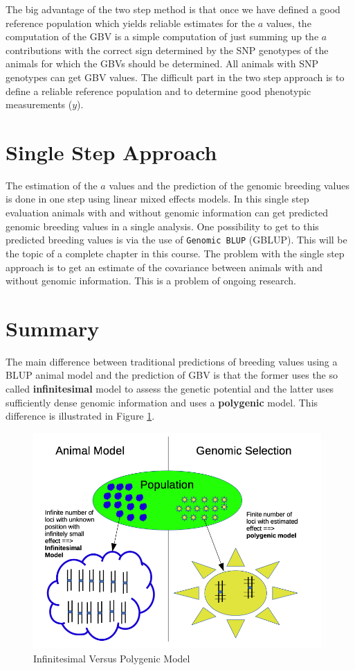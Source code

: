 \documentclass[
]{book}
\theoremstyle{definition}
\theoremstyle{definition}
\theoremstyle{definition}
\theoremstyle{remark}
\begin{document}
The big advantage of the two step method is that once we have defined a good reference population which yields reliable estimates for the \(a\) values, the computation of the GBV is a simple computation of just summing up the \(a\) contributions with the correct sign determined by the SNP genotypes of the animals for which the GBVs should be determined. All animals with SNP genotypes can get GBV values. The difficult part in the two step approach is to define a reliable reference population and to determine good phenotypic measurements (\(y\)).

\hypertarget{asm-single-step-approach}{%
\section{Single Step Approach}\label{asm-single-step-approach}}

The estimation of the \(a\) values and the prediction of the genomic breeding values is done in one step using linear mixed effects models. In this single step evaluation animals with and without genomic information can get predicted genomic breeding values in a single analysis. One possibility to get to this predicted breeding values is via the use of \texttt{Genomic\ BLUP} (GBLUP). This will be the topic of a complete chapter in this course. The problem with the single step approach is to get an estimate of the covariance between animals with and without genomic information. This is a problem of ongoing research.

\hypertarget{asm-summary}{%
\section{Summary}\label{asm-summary}}

The main difference between traditional predictions of breeding values using a BLUP animal model and the prediction of GBV is that the former uses the so called \textbf{infinitesimal} model to assess the genetic potential and the latter uses sufficiently dense genomic information and uses a \textbf{polygenic} model. This difference is illustrated in Figure \ref{fig:infinitesimalvspolygenic}.

\begin{figure}
\includegraphics[width=11cm]{odg/infinitesimalvspolygenic} \caption{Infinitesimal Versus Polygenic Model}\label{fig:infinitesimalvspolygenic}
\end{figure}
\end{document}
